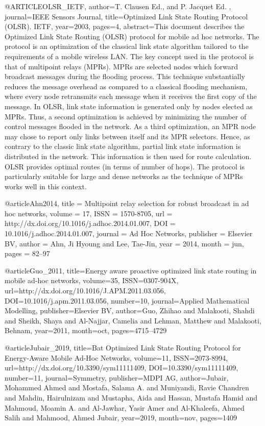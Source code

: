 @ARTICLE{OLSR_IETF,
  author={T. Clausen Ed., and P. Jacquet Ed. },
  journal={IEEE Sensors Journal}, 
  title={Optimized Link State Routing Protocol (OLSR). IETF}, 
  year={2003},
  pages={4},
  abstract={This document describes the Optimized Link State Routing (OLSR)
   protocol for mobile ad hoc networks.  The protocol is an optimization
   of the classical link state algorithm tailored to the requirements of
   a mobile wireless LAN.  The key concept used in the protocol is that
   of multipoint relays (MPRs).  MPRs are selected nodes which forward
   broadcast messages during the flooding process.  This technique
   substantially reduces the message overhead as compared to a classical
   flooding mechanism, where every node retransmits each message when it
   receives the first copy of the message.  In OLSR, link state
   information is generated only by nodes elected as MPRs.  Thus, a
   second optimization is achieved by minimizing the number of control
   messages flooded in the network.  As a third optimization, an MPR
   node may chose to report only links between itself and its MPR
   selectors.  Hence, as contrary to the classic link state algorithm,
   partial link state information is distributed in the network.  This
   information is then used for route calculation.  OLSR provides
   optimal routes (in terms of number of hops).  The protocol is
   particularly suitable for large and dense networks as the technique
   of MPRs works well in this context.}
}

@article{Ahn2014,
  title = {Multipoint relay selection for robust broadcast in ad hoc networks},
  volume = {17},
  ISSN = {1570-8705},
  url = {http://dx.doi.org/10.1016/j.adhoc.2014.01.007},
  DOI = {10.1016/j.adhoc.2014.01.007},
  journal = {Ad Hoc Networks},
  publisher = {Elsevier BV},
  author = {Ahn,  Ji Hyoung and Lee,  Tae-Jin},
  year = {2014},
  month = jun,
  pages = {82–97}
}

@article{Guo_2011, title={Energy aware proactive optimized link state routing in mobile ad-hoc networks}, volume={35}, ISSN={0307-904X}, url={http://dx.doi.org/10.1016/J.APM.2011.03.056}, DOI={10.1016/j.apm.2011.03.056}, number={10}, journal={Applied Mathematical Modelling}, publisher={Elsevier BV}, author={Guo, Zhihao and Malakooti, Shahdi and Sheikh, Shaya and Al-Najjar, Camelia and Lehman, Matthew and Malakooti, Behnam}, year={2011}, month=oct, pages={4715–4729} }

@article{Jubair_2019, title={Bat Optimized Link State Routing Protocol for Energy-Aware Mobile Ad-Hoc Networks}, volume={11}, ISSN={2073-8994}, url={http://dx.doi.org/10.3390/sym11111409}, DOI={10.3390/sym11111409}, number={11}, journal={Symmetry}, publisher={MDPI AG}, author={Jubair, Mohammed Ahmed and Mostafa, Salama A. and Muniyandi, Ravie Chandren and Mahdin, Hairulnizam and Mustapha, Aida and Hassan, Mustafa Hamid and Mahmoud, Moamin A. and Al-Jawhar, Yasir Amer and Al-Khaleefa, Ahmed Salih and Mahmood, Ahmed Jubair}, year={2019}, month=nov, pages={1409} }